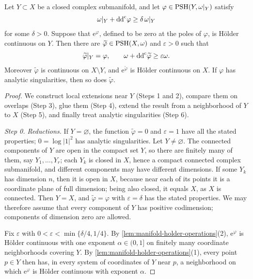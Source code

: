 \begin{theorem}\label{thm:holder-positive-potential-extension}
Let $Y\subset X$ be a closed complex submanifold, and let $\varphi\in\mathrm{PSH}(Y,\omega|_Y)$ satisfy
\[
 \omega|_Y+\mathrm{dd}^{\mathrm{c}}\varphi\geq\delta\,\omega|_Y
\]
for some $\delta>0$. Suppose that $\mathrm e^\varphi$, defined to be zero at the poles of $\varphi$, is H\"older continuous on $Y$. Then there are $\widetilde\varphi\in\mathrm{PSH}(X,\omega)$ and $\varepsilon>0$ such that
\[
 \widetilde\varphi|_Y=\varphi,\qquad
 \omega+\mathrm{dd}^{\mathrm{c}}\widetilde\varphi\geq\varepsilon\omega.
\]
Moreover $\widetilde\varphi$ is continuous on $X\setminus Y$, and $\mathrm e^{\widetilde\varphi}$ is H\"older continuous on $X$. If $\varphi$ has analytic singularities, then so does $\widetilde\varphi$.
\end{theorem}
\begin{proof}
We construct local extensions near $Y$ (Steps 1 and 2), compare them on overlaps (Step 3), glue them (Step 4), extend the result from a neighborhood of $Y$ to $X$ (Step 5), and finally treat analytic singularities (Step 6).

\emph{Step 0. Reductions.} If $Y=\varnothing$, the function $\widetilde\varphi=0$ and $\varepsilon=1$ have all the stated properties; $0=\log|1|^2$ has analytic singularities. Let $Y\neq\varnothing$. The connected components of $Y$ are open in the compact set $Y$, so there are finitely many of them, say $Y_1,\ldots,Y_r$; each $Y_k$ is closed in $X$, hence a compact connected complex submanifold, and different components may have different dimensions. If some $Y_k$ has dimension $n$, then it is open in $X$, because near each of its points it is a coordinate plane of full dimension; being also closed, it equals $X$, as $X$ is connected. Then $Y=X$, and $\widetilde\varphi=\varphi$ with $\varepsilon=\delta$ has the stated properties. We may therefore assume that every component of $Y$ has positive codimension; components of dimension zero are allowed.

Fix $\varepsilon$ with $0<\varepsilon<\min\{\delta/4,1/4\}$. By \cref{lem:manifold-holder-operations}(2), $\mathrm e^\varphi$ is H\"older continuous with one exponent $\alpha\in(0,1]$ on finitely many coordinate neighborhoods covering $Y$. By \cref{lem:manifold-holder-operations}(1), every point $p\in Y$ then has, in every system of coordinates of $Y$ near $p$, a neighborhood on which $\mathrm e^\varphi$ is H\"older continuous with exponent $\alpha$.


\end{proof}
